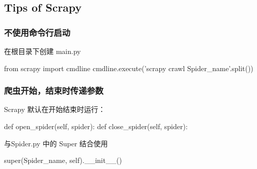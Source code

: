 \documentclass{article}
\begin{document}
    \subsection{Tips of Scrapy}
      \subsubsection{不使用命令行启动}
          在根目录下创建 main.py 
          \begin{python}
                from scrapy import cmdline
                cmdline.execute('scrapy crawl Spider_name'.split())
          \end{python}

     \subsubsection{ 爬虫开始，结束时传递参数 }
          Scrapy 默认在开始结束时运行：
          \begin{python}
                def open_spider(self, spider):
                def close_spider(self, spider):
          \end{python}

          与Spider.py 中的 Super 结合使用
          \begin{python}
            super(Spider_name,  self).__init__()
          \end{python}
\end{document}
